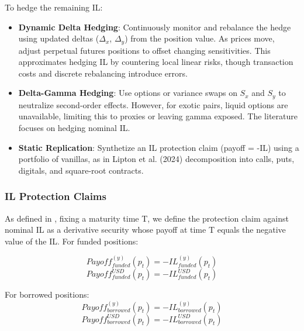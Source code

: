 \documentclass{article}
\begin{document}
To hedge the remaining IL:
\begin{itemize}
    \item \textbf{Dynamic Delta Hedging}: Continuously monitor and rebalance the hedge using updated deltas ($\Delta_x$, $\Delta_y$) from the position value. As prices move, adjust perpetual futures positions to offset changing sensitivities. This approximates hedging IL by countering local linear risks, though transaction costs and discrete rebalancing introduce errors.
    \item \textbf{Delta-Gamma Hedging}: Use options \cite{lipton2024} or variance swaps \cite{Fukasawa2022} on $S_x$ and $S_y$ to neutralize second-order effects. However, for exotic pairs, liquid options are unavailable, limiting this to proxies or leaving gamma exposed. The literature focuses on hedging nominal IL. 
    \item \textbf{Static Replication}: Synthetize an IL protection claim (payoff = -IL) using a portfolio of vanillas, as in Lipton et al. (2024) \cite{lipton2024} decomposition into calls, puts, digitals, and square-root contracts.
\end{itemize}

\subsubsection{IL Protection Claims}
As defined in \cite{lipton2024}, fixing a maturity time T, we define the protection claim against nominal IL as a derivative security whose payoff at time T equals the negative value of the IL.\newline
For funded positions:

\begin{equation}
    Payoff_{funded}^{(y)}(p_t) = -IL_{funded}^{(y)}(p_t)
    \label{eq:il_protection_claim_fund_y}
\end{equation}
\begin{equation}
    Payoff_{funded}^{USD}(p_t) = -IL_{funded}^{USD}(p_t)
    \label{eq:il_protection_claim_fund_usd}
\end{equation}

For borrowed positions:
\begin{equation}
    Payoff_{borrowed}^{(y)}(p_t) = -IL_{borrowed}^{(y)}(p_t)
    \label{eq:il_protection_claim_borr_y}
\end{equation}
\begin{equation}
    Payoff_{borrowed}^{USD}(p_t) = -IL_{borrowed}^{USD}(p_t)
    \label{eq:il_protection_claim_borr_usd}
\end{equation}
\end{document}
